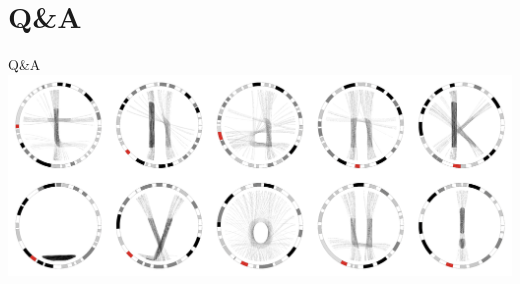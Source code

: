 \documentclass[12pt]{phage3slides} %
\begin{document}
{%
  \begin{frame}[plain]
  \end{frame}
}

\section{Q\&A}
\begin{frame}{Q\&A}
	\includegraphics[width=\textwidth]{thankyou.png}
	\begin{center}
		\begin{tabular}{rl}
			\end{tabular}\\[1cm]
			\fundingNSFABIannotation
	\end{center}
\end{frame}
\end{document}
